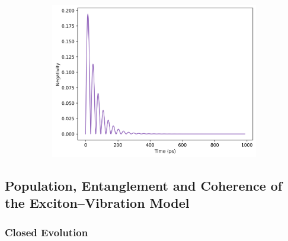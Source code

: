 \documentclass[11pt]{article}
\begin{document}
\begin{figure}[H]
    \begin{subfigure}{0.45\textwidth}
        \centering
        \includegraphics[width=0.85\linewidth]{Research Project/Code/results/JCM/OQS_Neg_Both_eg.png}
        \caption{}
        \label{fig:jcm_cqs_coh_eg}
    \end{subfigure}
    \hfill
    \caption{}
\end{figure}


\subsection{Population, Entanglement and Coherence of the Exciton--Vibration Model}
\subsubsection{Closed Evolution}
\end{document}

